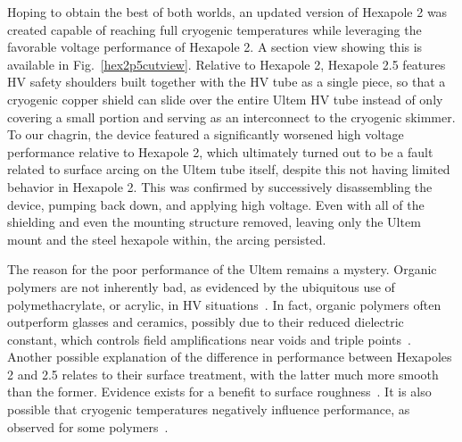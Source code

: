 Hoping to obtain the best of both worlds, an updated version of Hexapole 2 was created capable of reaching full cryogenic temperatures while leveraging the favorable voltage performance of Hexapole 2.
A section view showing this is available in Fig.~\ref{hex2p5cutview}.
Relative to Hexapole 2, Hexapole 2.5 features HV safety shoulders built together with the HV tube as a single piece, so that a cryogenic copper shield can slide over the entire Ultem HV tube instead of only covering a small portion and serving as an interconnect to the cryogenic skimmer.
To our chagrin, the device featured a significantly worsened high voltage performance relative to Hexapole 2, which ultimately turned out to be a fault related to surface arcing on the Ultem tube itself, despite this not having limited behavior in Hexapole 2.
This was confirmed by successively disassembling the device, pumping back down, and applying high voltage.
Even with all of the shielding and even the mounting structure removed, leaving only the Ultem mount and the steel hexapole within, the arcing persisted.

The reason for the poor performance of the Ultem remains a mystery.
Organic polymers are not inherently bad, as evidenced by the ubiquitous use of polymethacrylate, or acrylic, in HV situations~\cite{Miller1989}.
In fact, organic polymers often outperform glasses and ceramics, possibly due to their reduced dielectric constant, which controls field amplifications near voids and triple points~\citep[pp.~776]{Miller1989}.
Another possible explanation of the difference in performance between Hexapoles 2 and 2.5 relates to their surface treatment, with the latter much more smooth than the former.
Evidence exists for a benefit to surface roughness~\citep[Sec.~8.3.11]{Miller1995}.
It is also possible that cryogenic temperatures negatively influence performance, as observed for some polymers~\citep[Sec.~14.4]{Mazurek2007}.


